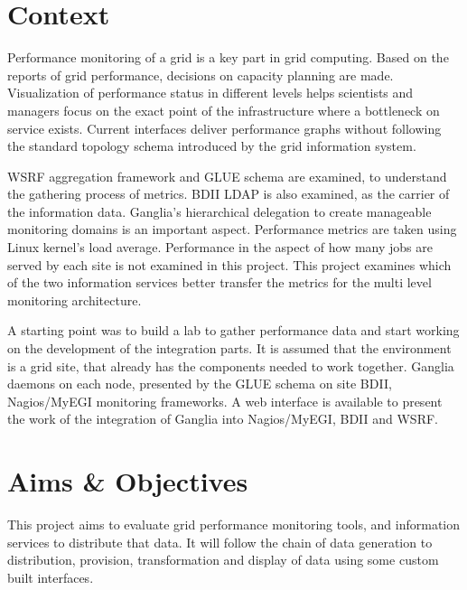 
\section{Context}

Performance monitoring of a grid is a key part in grid computing. Based on the reports of grid performance, decisions on capacity planning are made. Visualization of performance status in different levels helps scientists and managers focus on the exact point of the infrastructure where a bottleneck on service exists.
Current interfaces deliver performance graphs without following the standard topology schema introduced by the grid information system.

WSRF aggregation framework and GLUE schema are examined, to understand the gathering process of metrics. BDII LDAP is also examined, as the carrier of the information data. Ganglia's hierarchical delegation to create manageable monitoring domains is an important aspect. Performance metrics are taken using Linux kernel's load average.
Performance in the aspect of how many jobs are served by each site is not examined in this project.
This project examines which of the two information services better transfer the metrics for the multi level monitoring architecture.

A starting point was to build a lab to gather performance data and start working on the development of the integration parts.
It is assumed that the environment is a grid site, that already has the components needed to work together. Ganglia daemons on each node, presented by the GLUE schema on site BDII, Nagios/MyEGI monitoring frameworks.
A web interface is available to present the work of the integration of Ganglia into Nagios/MyEGI, BDII and WSRF.

\section{Aims \& Objectives}

This project aims to evaluate grid performance monitoring tools, and information services to distribute that data. It will follow the chain of data generation to distribution, provision, transformation and display of data using some custom built interfaces.

